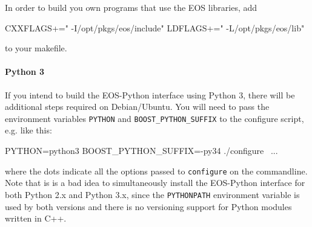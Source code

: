 In order to build you own programs that use the EOS libraries,
add
\begin{commandline}
CXXFLAGS+=" -I/opt/pkgs/eos/include"
LDFLAGS+=" -L/opt/pkgs/eos/lib"
\end{commandline}
to your makefile.

\paragraph{Python 3} If you intend to build the EOS-Python interface using Python 3, there will be
additional steps required on Debian/Ubuntu. You will need to pass the environment variables
\texttt{PYTHON} and \texttt{BOOST\_PYTHON\_SUFFIX} to the configure script, e.g. like this:
\begin{commandline}
PYTHON=python3 BOOST_PYTHON_SUFFIX=-py34 ./configure \
    ...
\end{commandline}
where the dots indicate all the options passed to \texttt{configure} on the commandline.
Note that is is a bad idea to simultaneously install the EOS-Python interface for both
Python 2.x and Python 3.x, since the \texttt{PYTHONPATH} environment variable is used
by both versions and there is no versioning support for Python modules written in C++.
